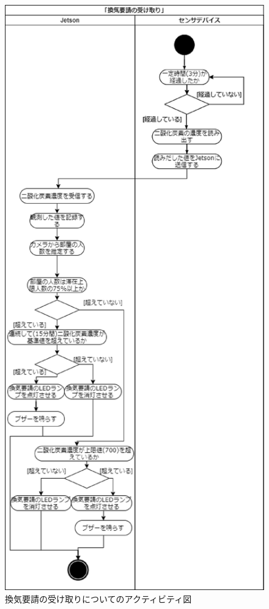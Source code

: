 \begin{figure}
	\centering
	\includegraphics[width=0.6\linewidth]{uml/activity_kanki_1}
	\caption{換気要請の受け取りについてのアクティビティ図}
	\label{activitykanki}
\end{figure}

